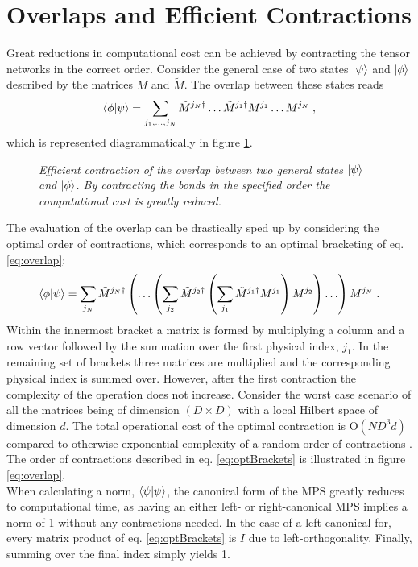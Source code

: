 \section{Overlaps and Efficient Contractions}
Great reductions in computational cost can be achieved by contracting the tensor networks in the correct order. Consider the general case of two states $\ket{\psi}$ and $\ket{\phi}$ described by the matrices $M$ and $\tilde{M}$. The overlap between these states reads
\begin{equation}
	\braket{\phi | \psi} = \sum_{j_1 , \ldots , j_N} \tilde{M}^{j_N \dag} \ldots \tilde{M}^{j_1 \dag} M^{j_1} \ldots M^{j_N} \; , 
	\label{eq:overlap}
\end{equation}
which is represented diagrammatically in figure \ref{fig:effCont}.
\begin{figure}[h!]
	\centering
	
	\caption{\textit{Efficient contraction of the overlap between two general states $\ket{\psi}$ and $\ket{\phi}$. By contracting the bonds in the specified order the computational cost is greatly reduced.}}
	\label{fig:effCont}
\end{figure}
The evaluation of the overlap can be drastically sped up by considering the optimal order of contractions, which corresponds to an optimal bracketing of eq. \eqref{eq:overlap}:
\begin{equation}
	\braket{\phi | \psi} = \sum_{j_N} \tilde{M}^{j_N \dag} \left( \ldots \left( \sum_{j_2} \tilde{M}^{j_2 \dag} \left( \sum_{j_1} \tilde{M}^{j_1 \dag} M^{j_1} \right) M^{j_2} \right) \ldots \right) M^{j_N} \; .
	\label{eq:optBrackets}
\end{equation}  
Within the innermost bracket a matrix is formed by multiplying a column and a row vector followed by the summation over the first physical index, $j_1$. In the remaining set of brackets three matrices are multiplied and the corresponding physical index is summed over. However, after the first contraction the complexity of the operation does not increase. Consider the worst case scenario of all the matrices being of dimension $(D \times D)$ with a local Hilbert space of dimension $d$. The total operational cost of the optimal contraction is $\mathrm{O}(N D^3 d)$ compared to otherwise exponential complexity of a random order of contractions \cite{schollwock}. The order of contractions described in eq. \eqref{eq:optBrackets} is illustrated in figure \ref{eq:overlap}.\\
When calculating a norm, $\braket{\psi | \psi}$, the canonical form of the MPS greatly reduces to computational time, as having an either left- or right-canonical MPS implies a norm of 1 without any contractions needed. In the case of a left-canonical for, every matrix product of eq. \eqref{eq:optBrackets} is $I$ due to left-orthogonality. Finally, summing over the final index simply yields 1.



